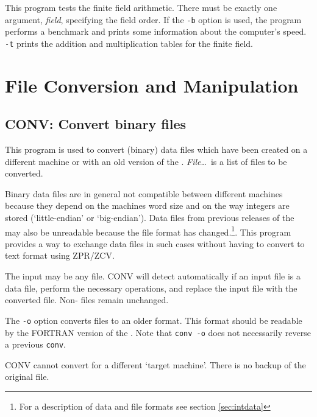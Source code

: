\Description
This program tests the finite field arithmetic. There must be exactly
one argument, {\it field}, specifying the field order. If the \verb"-b"
option is used, the program performs a benchmark and prints some
information about the computer's speed. \verb"-t" prints the addition
and multiplication tables for the finite field.





\section{File Conversion and Manipulation}\label{sec:fileconv}


\subsection{CONV: Convert binary files}
\Syntax


\Description
This program is used to convert {\MeatAxe} (binary) data files which
have been created on a different machine or with an old version
of the {\MeatAxe}.  {\it File}\ldots\ is a list of files to be
converted.

Binary data files are in general not compatible between different
machines because they depend on the machines word size and on the
way integers are stored (`little-endian' or `big-endian'). Data
files from previous releases of the {\MeatAxe} may also be unreadable
because the file format has changed.\footnote{For a description
of data and file formats see section \ref{sec:intdata}}.
This program provides a way to exchange data files in such cases
without having to convert to text format using ZPR/ZCV.

The input may be any file. CONV will detect automatically if an input
file is a {\MeatAxe} data file, perform the necessary operations, and
replace the input file with the converted file.
Non-{\MeatAxe} files remain unchanged. 

The {\tt -o} option converts files to an older format. This
format should be readable by the FORTRAN version of the {\MeatAxe}.
Note that {\tt conv\ -o} does not necessarily reverse a previous
{\tt conv}.


\Bugs
CONV cannot convert for a different `target machine'.
There is no backup of the original file.




